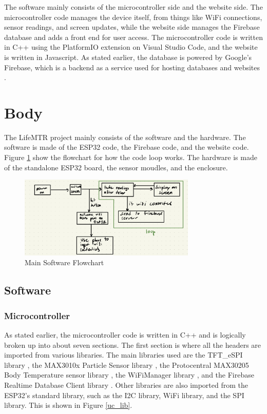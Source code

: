 \documentclass[12pt]{article}
\begin{document}
    The software mainly consists of the microcontroller side and the website side. The microcontroller code manages the device itself, from things like WiFi connections, sensor readings, and screen updates, while the website side manages the Firebase database and adds a front end for user access. The microcontroller code is written in C++ using the PlatformIO extension on Visual Studio Code, and the website is written in Javascript. As stated earlier, the database is powered by Google's Firebase, which is a backend as a service used for hosting databases and websites \cite{firebase}.

\newpage
\section{Body}
    The LifeMTR project mainly consists of the software and the hardware. The software is made of the ESP32 code, the Firebase code, and the website code. Figure \ref{fc} show the flowchart for how the code loop works. The hardware is made of the standalone ESP32 board, the sensor moudles, and the enclosure.
    \begin{figure}[h]
        \centering
        \includegraphics[width=0.75\textwidth]{flowchart}
        \caption{Main Software Flowchart}
        \label{fc}
    \end{figure} 

\subsection{Software}
\subsubsection{Microcontroller}
    As stated earlier, the microcontroller code is written in C++ and is logically broken up into about seven sections. The first section is where all the headers are imported from various libraries. The main libraries used are the TFT\_eSPI library \cite{tft_espi}, the MAX3010x Particle Sensor library \cite{sparkfun_max301x}, the Protocentral MAX30205 Body Temperature sensor library \cite{protocentral_max30205}, the WiFiManager library \cite{wifi_manager}, and the Firebase Realtime Database Client library \cite{firebase_client_lib}. Other libraries are also imported from the ESP32's standard library, such as the I2C library, WiFi library, and the SPI library. This is shown in Figure \ref{uc_lib}.
\end{document}
